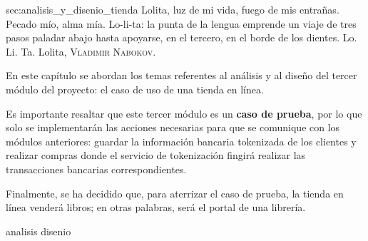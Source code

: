 %
%

   {sec:analisis_y_disenio_tienda}
{
  \epigrafe
  {%
    Lolita, luz de mi vida, fuego de mis entrañas. Pecado mío, alma mía.
    Lo-li-ta: la punta de la lengua emprende un viaje de tres pasos paladar
    abajo hasta apoyarse, en el tercero, en el borde de los dientes.
    Lo. Li. Ta.%
  }
  {%
    Lolita,
    \textsc{Vladimir Nabokov}.%
  }
}

\noindent
En este capítulo se abordan los temas referentes al análisis y al diseño del
tercer módulo del proyecto: el caso de uso de una tienda en línea.

Es importante resaltar que este tercer módulo es un \textbf{caso de prueba},
por lo que solo se implementarán las acciones necesarias para que se comunique
con los módulos anteriores: guardar la información bancaria tokenizada de los
clientes y realizar compras donde el servicio de tokenización fingirá realizar
las transacciones bancarias correspondientes.

Finalmente, se ha decidido que, para aterrizar el caso de prueba, la tienda en
línea venderá libros; en otras palabras, será el portal de una librería.

{analisis}
{disenio}
